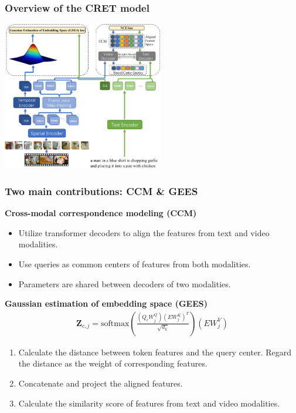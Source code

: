 \documentclass[notes, 10pt, aspectratio=169]{beamer}
\begin{document}
\begin{frame}
    \frametitle{Overview of the CRET model}
    \begin{center}
        \includegraphics[width=7cm]{model.png}
    \end{center}
\end{frame}

\begin{frame}
    \frametitle{Two main contributions: CCM \& GEES}
    \textbf{Cross-modal correspondence modeling (CCM)}
    \begin{itemize}
        \item Utilize transformer decoders to align the features from text and video modalities. 
        \item Use queries as common centers of features from both modalities.
        \item Parameters are shared between decoders of two modalities.
    \end{itemize}
    \textbf{Gaussian estimation of embedding space (GEES)}
    \begin{align*}
        \mathbf{Z}_{c,j} = \text{softmax}\left( \frac{(Q_cW_j^Q)(EW_j^K)^T}{\sqrt{d_k}} \right) (EW_j^V)
    \end{align*}
    \begin{enumerate}
        \item Calculate the distance between token features and the query center. Regard the distance as the weight of corresponding features.
        \item Concatenate and project the aligned features.
        \item Calculate the similarity score of features from text and video modalities.
    \end{enumerate}
\end{frame}
\end{document}
